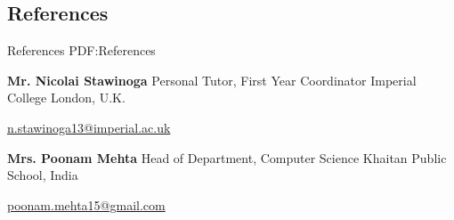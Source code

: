 \documentclass[letterpaper,10pt,oneside]{article}
\begin{document}
\begin{body}

\section
{References}
{References}
{PDF:References}

\BulletItem
\textbf{Mr. Nicolai Stawinoga}
\newline
Personal Tutor, First Year Coordinator
\newline
Imperial College London, U.K.
\begin{detail}
\SubItem
\href{mailto:n.stawinoga13@imperial.ac.uk}
{n.stawinoga13@imperial.ac.uk}
\,
\end{detail}

\GapNoBreak

\BulletItem
\textbf{Mrs. Poonam Mehta}
\newline
Head of Department, Computer Science
\newline
Khaitan Public School, India
\begin{detail}
\SubItem
\href{mailto:poonam.mehta15@gmail.com}
{poonam.mehta15@gmail.com}
\,
\end{detail}

\end{body}

\label{LastPage}~
\end{document}

